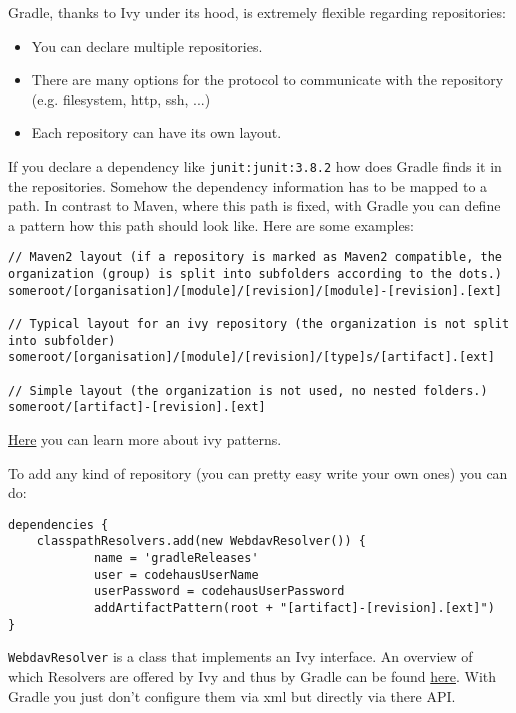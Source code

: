 Gradle, thanks to Ivy under its hood, is extremely flexible regarding repositories:
\begin{itemize}
	\item You can declare multiple repositories.
	\item There are many options for the protocol to communicate with the repository (e.g. filesystem, http, ssh, ...)
	\item Each repository can have its own layout.
\end{itemize}

If you declare a dependency like \texttt{junit:junit:3.8.2} how does Gradle finds it in the repositories. Somehow the dependency information has to be mapped to a path. In contrast to Maven, where this path is fixed, with Gradle you can define a pattern how this path should look like. Here are some examples:

\begin{Verbatim}
// Maven2 layout (if a repository is marked as Maven2 compatible, the organization (group) is split into subfolders according to the dots.)
someroot/[organisation]/[module]/[revision]/[module]-[revision].[ext]

// Typical layout for an ivy repository (the organization is not split into subfolder)
someroot/[organisation]/[module]/[revision]/[type]s/[artifact].[ext]

// Simple layout (the organization is not used, no nested folders.)
someroot/[artifact]-[revision].[ext]
\end{Verbatim}

\href{http://ant.apache.org/ivy/history/2.0.0-alpha2/concept.html}{Here} you can learn more about ivy patterns.

To add any kind of repository (you can pretty easy write your own ones) you can do:

\begin{Verbatim}
dependencies {
	classpathResolvers.add(new WebdavResolver()) {
	        name = 'gradleReleases'
	        user = codehausUserName
	        userPassword = codehausUserPassword
	        addArtifactPattern(root + "[artifact]-[revision].[ext]")
}	
\end{Verbatim}

\texttt{WebdavResolver} is a class that implements an Ivy interface. An overview of which Resolvers are offered by Ivy and thus by Gradle can be found \href{http://ant.apache.org/ivy/history/latest-milestone/configuration/resolvers.html}{here}. With Gradle you just don't configure them via xml but directly via there API.
 

